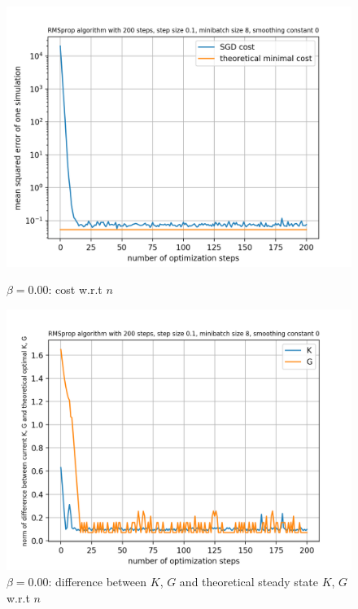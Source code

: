 \documentclass{article}
\begin{document}
\begin{figure}[h!]
	\centering
	\begin{minipage}[t]{.28\paperwidth}
		\centering
		\includegraphics[width=1.0\textwidth]{Figures/beta_0.png}
		\caption{$\beta = 0.00$: cost w.r.t $n$}
	\end{minipage}%
	\begin{minipage}[t]{.28\paperwidth}
		\centering
		\includegraphics[width=1.0\textwidth]{Figures/d_beta_0.png}
		\caption{$\beta = 0.00$: difference between $K$, $G$ and theoretical steady state $K$, $G$ w.r.t $n$}
	\end{minipage}%
	\begin{minipage}[t]{.28\paperwidth}
		\centering

\end{minipage}
\end{figure}
\end{document}
